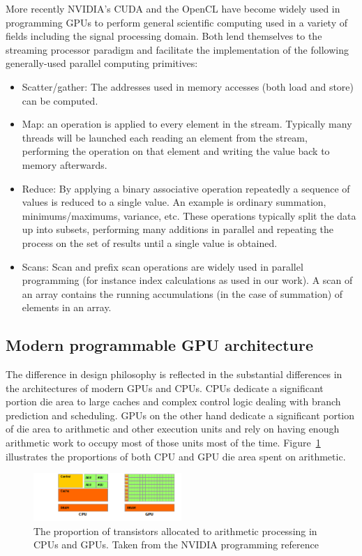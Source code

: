 More recently NVIDIA's CUDA \cite{cuda} and the OpenCL \cite{opencl} have become widely used in programming GPUs to perform general scientific computing used in a variety of fields including the signal 
processing domain. Both lend themselves to the streaming processor paradigm and facilitate the implementation
of the following generally-used parallel computing primitives:
\begin{itemize}
 \item Scatter/gather: The addresses used in memory accesses (both load and store) can be computed.
 \item Map: an operation is applied to every element in the stream. Typically many threads will be launched
       each reading an element from the stream, performing the operation on that element and writing the value
       back to memory afterwards.
 \item Reduce: By applying a binary associative operation repeatedly a sequence of values is reduced to a single value.
       An example is ordinary summation, minimums/maximums, variance, etc. These operations typically split the data up into
       subsets, performing many additions in parallel and repeating the process on the set of results until a single value is
       obtained. 
 \item Scans: Scan and prefix scan operations are widely used in parallel programming (for instance index calculations as used
       in our work). A scan of an array contains the running accumulations (in the case of summation) of elements in an array. 
\end{itemize}

\subsection{Modern programmable GPU architecture}
The difference in design philosophy is reflected in the substantial differences in the architectures of modern GPUs and CPUs. CPUs dedicate a significant portion die area to large caches and complex control logic dealing with
branch prediction and scheduling. GPUs on the other hand dedicate a significant portion of die area to arithmetic and other execution units and rely on having enough arithmetic work to occupy most of those units most of the time.
Figure~\ref{fig_cpu_gpu_diff} illustrates the proportions of both CPU and GPU die area spent on arithmetic.
\begin{figure}[ht!]
 \begin{mdframed}
  \centering
  \includegraphics[width=0.5\textwidth]{images/gpu-devotes-more-transistors-to-data-processing.png}
  \caption[CPU vs. GPU architecture]{The proportion of transistors allocated to arithmetic processing in CPUs and GPUs. Taken from the NVIDIA programming reference \cite{cuda}}
  \label{fig_cpu_gpu_diff}
 \end{mdframed}
\end{figure}

